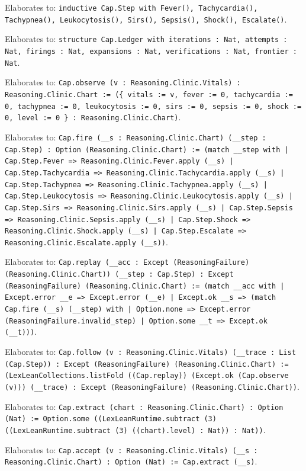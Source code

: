 \documentclass[11pt]{article}
\begin{document}
\noindent Elaborates to: \texttt{inductive Cap.Step with Fever(), Tachycardia(), Tachypnea(), Leukocytosis(), Sirs(), Sepsis(), Shock(), Escalate()}.\par
\noindent Elaborates to: \texttt{structure Cap.Ledger with iterations : Nat, attempts : Nat, firings : Nat, expansions : Nat, verifications : Nat, frontier : Nat}.\par
\noindent Elaborates to: \texttt{Cap.observe (v : Reasoning.Clinic.Vitals) : Reasoning.Clinic.Chart := (\{ vitals := v, fever := 0, tachycardia := 0, tachypnea := 0, leukocytosis := 0, sirs := 0, sepsis := 0, shock := 0, level := 0 \} : Reasoning.Clinic.Chart)}.\par
\noindent Elaborates to: \texttt{Cap.fire (\_\_s : Reasoning.Clinic.Chart) (\_\_step : Cap.Step) : Option (Reasoning.Clinic.Chart) := (match \_\_step with | Cap.Step.Fever => Reasoning.Clinic.Fever.apply (\_\_s) | Cap.Step.Tachycardia => Reasoning.Clinic.Tachycardia.apply (\_\_s) | Cap.Step.Tachypnea => Reasoning.Clinic.Tachypnea.apply (\_\_s) | Cap.Step.Leukocytosis => Reasoning.Clinic.Leukocytosis.apply (\_\_s) | Cap.Step.Sirs => Reasoning.Clinic.Sirs.apply (\_\_s) | Cap.Step.Sepsis => Reasoning.Clinic.Sepsis.apply (\_\_s) | Cap.Step.Shock => Reasoning.Clinic.Shock.apply (\_\_s) | Cap.Step.Escalate => Reasoning.Clinic.Escalate.apply (\_\_s))}.\par
\noindent Elaborates to: \texttt{Cap.replay (\_\_acc : Except (ReasoningFailure) (Reasoning.Clinic.Chart)) (\_\_step : Cap.Step) : Except (ReasoningFailure) (Reasoning.Clinic.Chart) := (match \_\_acc with | Except.error \_\_e => Except.error (\_\_e) | Except.ok \_\_s => (match Cap.fire (\_\_s) (\_\_step) with | Option.none => Except.error (ReasoningFailure.invalid\_step) | Option.some \_\_t => Except.ok (\_\_t)))}.\par
\noindent Elaborates to: \texttt{Cap.follow (v : Reasoning.Clinic.Vitals) (\_\_trace : List (Cap.Step)) : Except (ReasoningFailure) (Reasoning.Clinic.Chart) := (LexLeanCollections.listFold ((Cap.replay)) (Except.ok (Cap.observe (v))) (\_\_trace) : Except (ReasoningFailure) (Reasoning.Clinic.Chart))}.\par
\noindent Elaborates to: \texttt{Cap.extract (chart : Reasoning.Clinic.Chart) : Option (Nat) := Option.some ((LexLeanRuntime.subtract (3) ((LexLeanRuntime.subtract (3) ((chart).level) : Nat)) : Nat))}.\par
\noindent Elaborates to: \texttt{Cap.accept (v : Reasoning.Clinic.Vitals) (\_\_s : Reasoning.Clinic.Chart) : Option (Nat) := Cap.extract (\_\_s)}.\par
\end{document}

